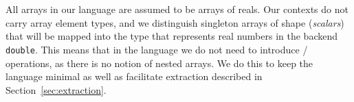 \begin{code}[hide]%
%
\>[2]\<%
\\
\>[0]\<%
\\
\>[0]\<%
\\
\>[0]\<%
\\
\>[0]\<%
\\
\>[0]\<%
\\
\>[0]\<%
\\
\>[0]\<%
\\
\>[0]\<%
\\
\>[0]\<%
\\
%
\\[\AgdaEmptyExtraSkip]%
\>[0][@{}l@{\AgdaIndent{0}}]%
\>[2]\AgdaSpace{}%
\AgdaSpace{}%
\<%
\\
%
\>[2]\AgdaSpace{}%
\AgdaSpace{}%
\<%
\end{code}

All arrays in our language are assumed to be arrays of reals.  Our contexts
do not carry array element types, and we distinguish
singleton arrays of shape \AC{[]} (\emph{scalars}) that will be mapped
into the type that represents real numbers in the backend \eg{} \texttt{double}.
This means that in the language we do not need to introduce
/ operations, as there is no notion of nested arrays.
We do this to keep the language minimal as well as facilitate extraction
described in Section~\ref{sec:extraction}. 


